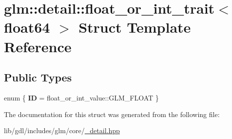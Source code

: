 \hypertarget{structglm_1_1detail_1_1float__or__int__trait_3_01float64_01_4}{}\section{glm\+:\+:detail\+:\+:float\+\_\+or\+\_\+int\+\_\+trait$<$ float64 $>$ Struct Template Reference}
\label{structglm_1_1detail_1_1float__or__int__trait_3_01float64_01_4}
\subsection*{Public Types}
\begin{DoxyCompactItemize}
\item 
\hypertarget{structglm_1_1detail_1_1float__or__int__trait_3_01float64_01_4_a513d4d23f81f5a5e7eb1090d81ee3613}{}enum \{ {\bfseries I\+D} = float\+\_\+or\+\_\+int\+\_\+value\+:\+:G\+L\+M\+\_\+\+F\+L\+O\+A\+T
 \}\label{structglm_1_1detail_1_1float__or__int__trait_3_01float64_01_4_a513d4d23f81f5a5e7eb1090d81ee3613}

\end{DoxyCompactItemize}


The documentation for this struct was generated from the following file\+:\begin{DoxyCompactItemize}
\item 
lib/gdl/includes/glm/core/\hyperlink{__detail_8hpp}{\+\_\+detail.\+hpp}\end{DoxyCompactItemize}
